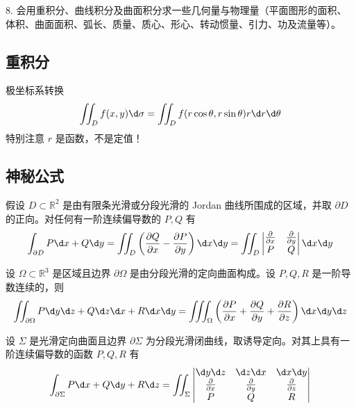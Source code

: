 8. 会用重积分、曲线积分及曲面积分求一些几何量与物理量（平面图形的面积、体积、曲面面积、弧长、质量、质心、形心、转动惯量、引力、功及流量等）。

\subsection{重积分}

极坐标系转换
\[ \iint_{D} f(x, y) \d \sigma = \iint_{D} f(r \cos \theta, r \sin \theta) r \d r \d \theta  \]
特别注意 $r$ 是函数，不是定值！

\subsection{神秘公式}

\begin{theorem}[Green 公式]
	假设 $D \subset \mathbb{R}^2$ 是由有限条光滑或分段光滑的 Jordan 曲线所围成的区域，并取 $\partial D$ 的正向。对任何有一阶连续偏导数的 $P, Q$ 有
	\[ \int_{\partial D} P \d x + Q \d y = \iint_{D} \left( \frac{\partial Q}{\partial x} - \frac{\partial P}{\partial y} \right) \d x \d y = \iint_{D} \left| \begin{matrix}
			\frac{\partial}{\partial x} & \frac{\partial}{\partial y} \\
			P                           & Q
		\end{matrix} \right| \d x \d y \]
\end{theorem}

\begin{theorem}[Gauss 公式]
	设 $\Omega \subset \mathbb{R}^3$ 是区域且边界 $\partial \Omega$ 是由分段光滑的定向曲面构成。设 $P, Q, R$ 是一阶导数连续的，则
	\[ \iint_{\partial \Omega} P \d y \d z + Q \d z \d x + R \d x \d y = \iiint_{\Omega} \left( \frac{\partial P}{\partial x} + \frac{\partial Q}{\partial y} + \frac{\partial R}{\partial z} \right) \d x \d y \d z \]
\end{theorem}

\begin{theorem}[Stokes 公式]
	设 $\Sigma$ 是光滑定向曲面且边界 $\partial \Sigma$ 为分段光滑闭曲线，取诱导定向。对其上具有一阶连续偏导数的函数 $P, Q, R$ 有
	\[ \int_{\partial \Sigma} P \d x + Q \d y + R \d z = \iint_\Sigma \left| \begin{matrix}
			\d y \d z                   & \d z \d x                   & \d x \d y                   \\
			\frac{\partial}{\partial x} & \frac{\partial}{\partial y} & \frac{\partial}{\partial z} \\
			P                           & Q                           & R
		\end{matrix} \right| \]
\end{theorem}

